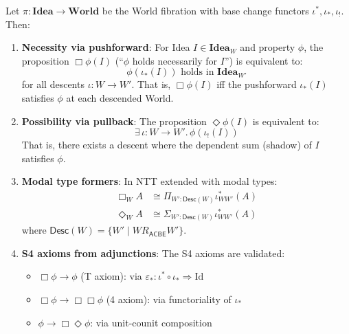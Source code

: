 \begin{theorem}
\label{thm:fibered-modal}
Let $\pi : \mathbf{Idea} \to \mathbf{World}$ be the World fibration with base
change functors $\iota^*, \iota_*, \iota_!$. Then:
\begin{enumerate}
  \item \textbf{Necessity via pushforward}: For Idea $I \in \mathbf{Idea}_W$ and property
        $\phi$, the proposition $\Box\phi(I)$ (``$\phi$ holds necessarily for $I$'')
        is equivalent to:
        \[
          \phi(\iota_*(I)) \text{ holds in } \mathbf{Idea}_{W'}
        \]
        for all descents $\iota : W \to W'$. That is, $\Box\phi(I)$ iff the pushforward
        $\iota_*(I)$ satisfies $\phi$ at each descended World.

  \item \textbf{Possibility via pullback}: The proposition $\Diamond\phi(I)$ is equivalent to:
        \[
          \exists\, \iota : W \to W'.\, \phi(\iota_!(I))
        \]
        That is, there exists a descent where the dependent sum (shadow) of $I$
        satisfies $\phi$.

  \item \textbf{Modal type formers}: In NTT extended with modal types:
        \begin{align*}
          \Box_W A &\cong \Pi_{W' : \mathsf{Desc}(W)} \iota_{WW'}^*(A) \\
          \Diamond_W A &\cong \Sigma_{W' : \mathsf{Desc}(W)} \iota_{WW'}^*(A)
        \end{align*}
        where $\mathsf{Desc}(W) = \{W' \mid W \mathrel{R_{\mathsf{ACBE}}} W'\}$.

  \item \textbf{S4 axioms from adjunctions}: The S4 axioms are validated:
        \begin{itemize}
          \item $\Box\phi \to \phi$ (T axiom): via $\varepsilon_* : \iota^* \circ \iota_* \Rightarrow \mathrm{Id}$
          \item $\Box\phi \to \Box\Box\phi$ (4 axiom): via functoriality of $\iota_*$
          \item $\phi \to \Box\Diamond\phi$: via unit-counit composition
        \end{itemize}
\end{enumerate}
\end{theorem}

